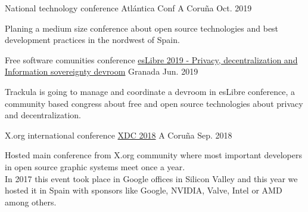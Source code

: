 


\begin{cventries}


\cventry
{National technology conference} %
{Atlántica Conf} %
{A Coruña} %
{Oct. 2019} %
{ %
\begin{cvitems}
Planing a medium size conference about open source technologies and best development practices in the nordwest of Spain.
\end{cvitems}
}


\cventry
{Free software comunities conference} %
{\href{https://trackula.org/en/page/cfp-eslibre-2019/}{esLibre 2019 - Privacy, decentralization and Information sovereignty devroom}} %
{Granada} %
{Jun. 2019} %
{ %
\begin{cvitems}
Trackula is going to manage and coordinate a devroom in esLibre conference, a community based congress about free and open source technologies about privacy and decentralization.
\end{cvitems}
}


\cventry
{X.org international conference} %
{\href{https://xdc2018.x.org/}{XDC 2018}} %
{A Coruña} %
{Sep. 2018} %
{ %
\begin{cvitems}
Hosted main conference from X.org community where most important developers in open source graphic systems meet once a year. \\
In 2017 this event took place in Google offices in Silicon Valley and this year we hosted it in Spain with sponsors like Google, NVIDIA, Valve, Intel or AMD among others.
\end{cvitems}
}


\end{cventries}
